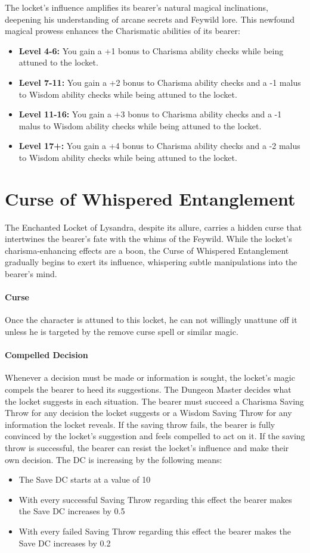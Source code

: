 The locket's influence amplifies its bearer's natural magical inclinations, deepening his understanding of arcane secrets and Feywild lore. This newfound magical prowess enhances the Charismatic abilities of its bearer:
\begin{itemize}
	\item[$\ast$] \textbf{Level 4-6:} You gain a +1 bonus to Charisma ability checks while being attuned to the locket.
	\item \textbf{Level 7-11:} You gain a +2 bonus to Charisma ability checks and a -1 malus to Wisdom ability checks while being attuned to the locket.
	\item \textbf{Level 11-16:} You gain a +3 bonus to Charisma ability checks and a -1 malus to Wisdom ability checks while being attuned to the locket.
	\item \textbf{Level 17+:} You gain a +4 bonus to Charisma ability checks and a -2 malus to Wisdom ability checks while being attuned to the locket.
\end{itemize}
\section*{Curse of Whispered Entanglement}
The Enchanted Locket of Lysandra, despite its allure, carries a hidden curse that intertwines the bearer's fate with the whims of the Feywild. While the locket's charisma-enhancing effects are a boon, the Curse of Whispered Entanglement gradually begins to exert its influence, whispering subtle manipulations into the bearer's mind.

\paragraph*{Curse}
Once the character is attuned to this locket, he can not willingly unattune off it unless he is targeted by the remove curse spell or similar magic.

\paragraph{Compelled Decision}
Whenever a decision must be made or information is sought, the locket's magic compels the bearer to heed its suggestions. The Dungeon Master decides what the locket suggests in each situation. The bearer must succeed a Charisma Saving Throw for any decision the locket suggests or a Wisdom Saving Throw for any information the locket reveals. If the saving throw fails, the bearer is fully convinced by the locket's suggestion and feels compelled to act on it. If the saving throw is successful, the bearer can resist the locket's influence and make their own decision. The DC is increasing by the following means:
\eject
\begin{itemize}
	\item The Save DC starts at a value of 10
	\item With every successful Saving Throw regarding this effect the bearer makes the Save DC increases by 0.5
	\item With every failed Saving Throw regarding this effect the bearer makes the Save DC increases by 0.2
\end{itemize}
